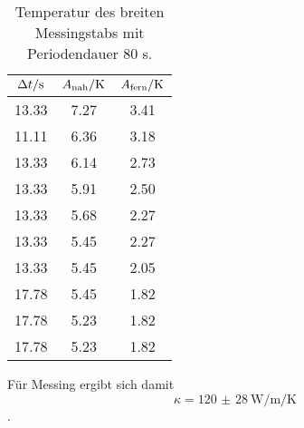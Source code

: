 \begin{table}

	\centering

	\caption{Temperatur des breiten Messingstabs mit Periodendauer 80 s.}


	\begin{tabular}{S[table-format=3.2] S[table-format=3.2]S[table-format=3.2]}

		\toprule

		{$\Delta t/\si[per-mode=reciprocal]{\second}$}&{$A_\text{nah}/\si[per-mode=reciprocal]{\kelvin}$}&{$A_\text{fern}/\si[per-mode=reciprocal]{\kelvin}$} \\

		\midrule

		13.33 & 7.27 & 3.41 \\

		11.11 & 6.36 & 3.18 \\

		13.33 & 6.14 & 2.73 \\

		13.33 & 5.91 & 2.50 \\

		13.33 & 5.68 & 2.27 \\

		13.33 & 5.45 & 2.27 \\

		13.33 & 5.45 & 2.05 \\

		17.78 & 5.45 & 1.82 \\

		17.78 & 5.23 & 1.82 \\

		17.78 & 5.23 & 1.82 \\

		\bottomrule

	\end{tabular}

	\label{tab:tab2}

\end{table}

Für Messing ergibt sich damit \[\kappa = \SI{120(28)}{\watt\per\metre\per\kelvin}\].

